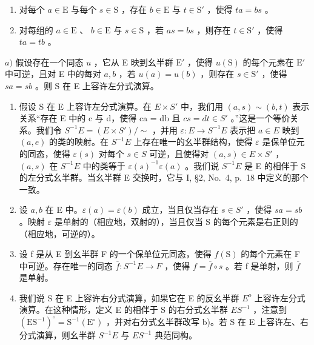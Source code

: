 \begin{enumerate}
\def\labelenumi{(\roman{enumi})}
\item
  对每个 \(a \in \mathrm{E}\) 与每个 \(s \in \mathrm{S}\) ，存在 \(b \in \mathrm{E}\) 与 \(t \in \mathrm{S}'\) ，使得 \(ta = bs\) 。
\item
  对每组的 \(a \in \mathrm{E}\) 、 \(b \in \mathrm{E}\) 与 \(s \in \mathrm{S}\) ，若 \(as = bs\) ，则存在 \(t \in \mathrm{S}'\) ，使得 \(ta = tb\) 。
\end{enumerate}

\(a)\) 假设存在一个同态 \(u\) ，它从 E 映到幺半群 \(\mathrm{E}'\) ，使得 \(u(\mathrm{S})\) 的每个元素在 \(\mathrm{E}'\) 中可逆，且对 E 中的每对 \(a, b\) ，若 \(u(a) = u(b)\) ，则存在 \(s \in \mathrm{S}'\) ，使得 \(sa = sb\) 。则 S 在 E 上容许左分式演算。

\begin{enumerate}
\def\labelenumi{\alph{enumi})}
\setcounter{enumi}{1}
\item
  假设 S 在 E 上容许左分式演算。在 \(E \times S'\) 中，我们用 \((a, s) \sim (b, t)\) 表示关系``存在 E 中的 c 与 d，使得 ca = db 且 \(cs = dt \in S'\) 。''这是一个等价关系。我们令 \(S^{-1}E = (E \times S') / \sim\) ，并用 \(\varepsilon : E \to S^{-1}E\) 表示把 \(a \in E\) 映到 \((a, e)\) 的类的映射。在 \(S^{-1}E\) 上存在唯一的幺半群结构，使得 \(\varepsilon\) 是保单位元的同态，使得 \(\varepsilon(s)\) 对每个 \(s \in S\) 可逆，且使得对 \((a, s) \in E \times S'\) ，\((a, s)\) 在 \(S^{-1}E\) 中的类等于 \(\varepsilon(s)^{-1}\varepsilon(a)\) 。我们说 \(S^{-1}E\) 是 E 的相伴于 S 的左分式幺半群。当幺半群 E 交换时，它与 I, §2, No.~4, p.~18 中定义的那个一致。
\item
  设 \(a, b\) 在 E 中。\(\varepsilon(a) = \varepsilon(b)\) 成立，当且仅当存在 \(s \in S'\) ，使得 \(sa = sb\) 。映射 \(\varepsilon\) 是单射的（相应地，双射的），当且仅当 S 的每个元素是右正则的（相应地，可逆的）。
\item
  设 f 是从 E 到幺半群 F 的一个保单位元同态，使得 \(f(\mathrm{S})\) 的每个元素在 F 中可逆。存在唯一的同态 \(\overline{f}: S^{-1}E \to F\) ，使得 \(f = \overline{f} \circ s\) 。若 f 是单射，则 \(\overline{f}\) 是单射。
\item
  我们说 S 在 E 上容许右分式演算，如果它在 E 的反幺半群 \(E^{o}\) 上容许左分式演算。在这种情形，定义 E 的相伴于 S 的右分式幺半群 \(ES^{-1}\) ，注意到 \((\mathrm{ES}^{-1})^{\circ} = \mathrm{S}^{-1}(\mathrm{E}^{\circ})\) ，并对右分式幺半群改写 b)。若 S 在 E 上容许左、右分式演算，则幺半群 \(S^{-1}E\) 与 \(ES^{-1}\) 典范同构。
\end{enumerate}

